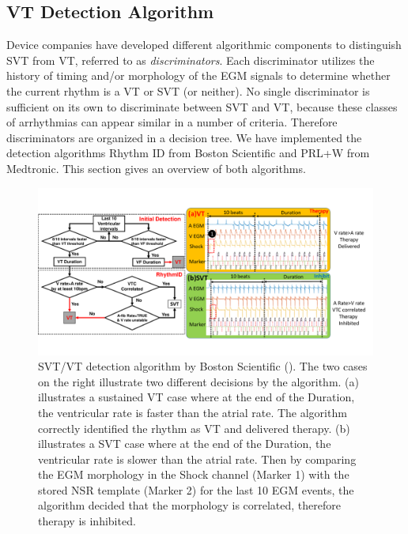 \subsection{VT Detection Algorithm}
\label{sec:svtvt}
Device companies have developed different algorithmic components to distinguish SVT from VT, referred to as \emph{discriminators}. 
Each discriminator utilizes the history of timing and/or morphology of the EGM signals to determine whether the current rhythm is a VT or SVT (or neither).
No single discriminator is sufficient on its own to discriminate between SVT and VT, because these classes of arrhythmias can appear similar in a number of criteria.
Therefore discriminators are organized in a decision tree.%
We have implemented the detection algorithms Rhythm ID from Boston Scientific and PRL+W from Medtronic. 
This section gives an overview of both algorithms.


\begin{figure}[t]
	\centering
	\includegraphics[scale=0.4]{figs/BS_det.pdf}
	\caption{\small SVT/VT detection algorithm by Boston Scientific (\cite{compass}). The two cases on the right illustrate two different decisions by the algorithm. (a) illustrates a sustained VT case where at the end of the Duration, the ventricular rate is faster than the atrial rate. The algorithm correctly identified the rhythm as VT and delivered therapy. (b) illustrates a SVT case where at the end of the Duration, the ventricular rate is slower than the atrial rate. Then by comparing the EGM morphology in the Shock channel (Marker 1) with the stored NSR template (Marker 2) for the last 10 EGM events, the algorithm decided that the morphology is correlated, therefore therapy is inhibited.}
	\label{fig:BS_det}
\end{figure}

